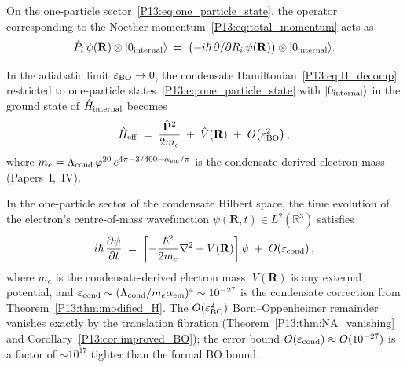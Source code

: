 \begin{lemma}
\label{P13:lem:momentum_operator}
On the one-particle sector~\eqref{P13:eq:one_particle_state},
the operator corresponding to the Noether momentum~\eqref{P13:eq:total_momentum}
acts as
\begin{equation}
  \hat{P}_i\,\psi(\mathbf{R})\otimes|0_{\rm internal}\rangle
  \;=\; \bigl(-i\hbar\,\partial/\partial R_i\,\psi(\mathbf{R})\bigr)
        \otimes|0_{\rm internal}\rangle.
  \label{P13:eq:momentum_on_sector}
\end{equation}
\end{lemma}

\begin{theorem}
\label{P13:thm:born_oppenheimer}
In the adiabatic limit $\varepsilon_{\rm BO}\to0$, the condensate Hamiltonian~\eqref{P13:eq:H_decomp}
restricted to one-particle states~\eqref{P13:eq:one_particle_state} with
$|0_{\rm internal}\rangle$ in the ground state of $\hat{H}_{\rm internal}$ becomes
\begin{equation}
  \hat{H}_{\rm eff}
  \;=\; \frac{\hat{\mathbf{P}}^2}{2m_e}
  \;+\; \hat{V}(\mathbf{R})
  \;+\; O\!\left(\varepsilon_{\rm BO}^2\right),
  \label{P13:eq:Heff_BO}
\end{equation}
where $m_e = \Lambda_{\mathrm{cond}}\,\varphi^{20}\,e^{4\pi-3/400-\alpha_{\mathrm{em}}/\pi}$
is the condensate-derived electron mass (Papers~I,~IV).
\end{theorem}

\begin{theorem}
\label{P13:thm:schrodinger}
In the one-particle sector of the condensate Hilbert space,
the time evolution of the electron's centre-of-mass wavefunction
$\psi(\mathbf{R},t)\in L^2(\mathbb{R}^3)$ satisfies
\begin{equation}
  i\hbar\,\frac{\partial\psi}{\partial t}
  \;=\;
  \left[-\frac{\hbar^2}{2m_e}\nabla^2 + V(\mathbf{R})\right]\psi
  \;+\; O\!\left(\varepsilon_{\rm cond}\right),
  \label{P13:eq:schrodinger_derived}
\end{equation}
where $m_e$ is the condensate-derived electron mass,
$V(\mathbf{R})$ is any external potential,
and $\varepsilon_{\rm cond}\sim(\Lambda_{\mathrm{cond}}/m_e\alpha_{\mathrm{em}})^4\sim10^{-27}$ is the
condensate correction from Theorem~\ref{P13:thm:modified_H}.
The $O(\varepsilon_{\rm BO}^2)$ Born--Oppenheimer remainder vanishes exactly
by the translation fibration (Theorem~\ref{P13:thm:NA_vanishing}
and Corollary~\ref{P13:cor:improved_BO}); the error bound
$O(\varepsilon_{\rm cond})\approx O(10^{-27})$ is a factor of
$\sim10^{17}$ tighter than the formal BO bound.
\end{theorem}

